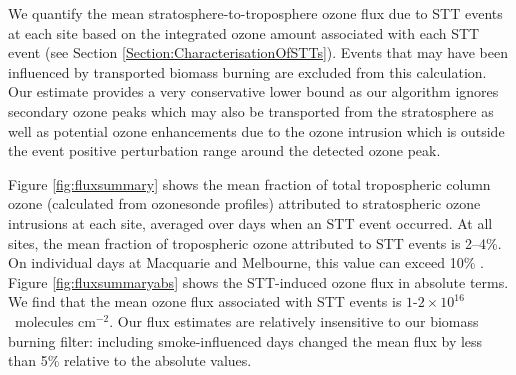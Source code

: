 \documentclass{article}
\begin{document}
  We quantify the mean stratosphere-to-troposphere ozone flux due to STT events at each site based on the integrated ozone amount associated with each STT event (see Section \ref{Section:CharacterisationOfSTTs}).
  Events that may have been influenced by transported biomass burning are excluded from this calculation.
  Our estimate provides a very conservative lower bound as our algorithm ignores secondary ozone peaks which may also be transported from the stratosphere as well as potential ozone enhancements due to the ozone intrusion which is outside the event positive perturbation range around the detected ozone peak.
  
  Figure \ref{fig:fluxsummary} shows the mean fraction of total tropospheric column ozone (calculated from ozonesonde profiles) attributed to stratospheric ozone intrusions at each site, averaged over days when an STT event occurred.
  At all sites, the mean fraction of tropospheric ozone attributed to STT events is 2--4\%. On individual days at Macquarie and Melbourne, this value can exceed 10\% .
  Figure \ref{fig:fluxsummaryabs} shows the STT-induced ozone flux in absolute terms.
  We find that the mean ozone flux associated with STT events is $1$-$2 \times 10^{16}$~molecules cm$^{-2}$.
  Our flux estimates are relatively insensitive to our biomass burning filter: including smoke-influenced days changed the mean flux by less than 5\% relative to the absolute values.
  
\end{document}
